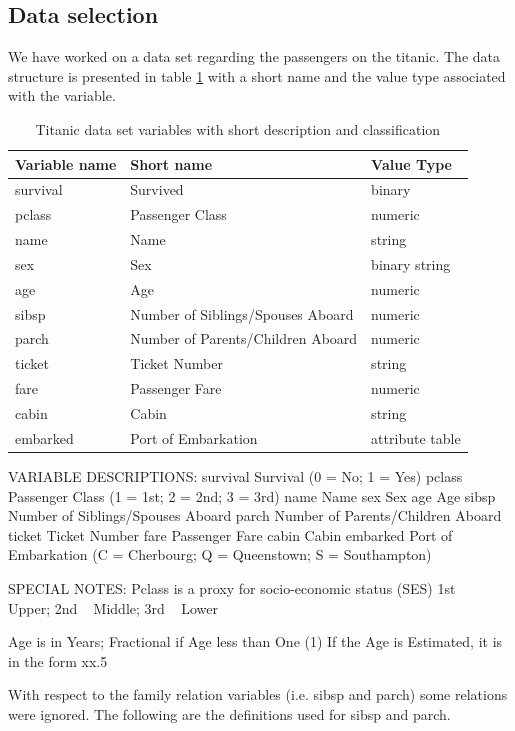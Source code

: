 \documentclass[a4paper,11pt]{article}
\begin{document}
\subsection{Data selection}
We have worked on a data set regarding the passengers on the titanic. The data structure is presented in table \ref{titanData} with a short name and the value type associated with the variable.
\begin{table}[h]
\begin{tabular}{|l|l|l|}
\hline
Variable name & Short name & Value Type\\
\hline
survival & Survived & binary\\
pclass & Passenger Class & numeric\\
name & Name & string\\
sex & Sex & binary string\\
age & Age & numeric\\
sibsp & Number of Siblings/Spouses Aboard & numeric\\
parch & Number of Parents/Children Aboard & numeric\\
ticket & Ticket Number & string\\
fare & Passenger Fare & numeric\\
cabin & Cabin & string\\
embarked & Port of Embarkation & attribute table\\
\hline
\end{tabular}
\caption{Titanic data set variables with short description and classification}
\label{titanData}
\end{table}
VARIABLE DESCRIPTIONS:
survival        Survival
                (0 = No; 1 = Yes)
pclass          Passenger Class
                (1 = 1st; 2 = 2nd; 3 = 3rd)
name            Name
sex             Sex
age             Age
sibsp           Number of Siblings/Spouses Aboard
parch           Number of Parents/Children Aboard
ticket          Ticket Number
fare            Passenger Fare
cabin           Cabin
embarked        Port of Embarkation
                (C = Cherbourg; Q = Queenstown; S = Southampton)

SPECIAL NOTES:
Pclass is a proxy for socio-economic status (SES)
 1st ~ Upper; 2nd ~ Middle; 3rd ~ Lower

Age is in Years; Fractional if Age less than One (1)
 If the Age is Estimated, it is in the form xx.5

With respect to the family relation variables (i.e. sibsp and parch)
some relations were ignored.  The following are the definitions used
for sibsp and parch.
\end{document}
